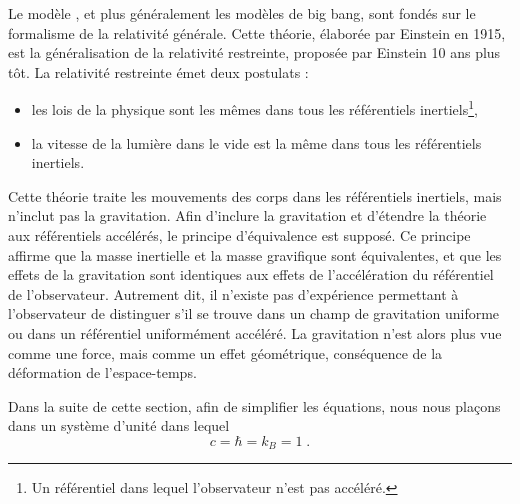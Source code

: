 Le modèle \lcdm{}, et plus généralement les modèles de big bang, sont fondés sur le formalisme de la relativité générale.
Cette théorie, élaborée par Einstein en 1915, est la généralisation de la relativité restreinte, proposée par Einstein 10 ans plus tôt. La relativité restreinte émet deux postulats :
  \begin{itemize}[label=$\bullet$]
  \item les lois de la physique sont les mêmes dans tous les référentiels inertiels\footnote{Un référentiel dans lequel l'observateur n'est pas accéléré.},
  \item la vitesse de la lumière dans le vide est la même dans tous les référentiels inertiels.
  \end{itemize}
Cette théorie traite les mouvements des corps dans les référentiels inertiels, mais n'inclut pas la gravitation. Afin d'inclure la gravitation et d'étendre la théorie aux référentiels accélérés, le principe d'équivalence est supposé.
Ce principe affirme que la masse inertielle et la masse gravifique sont équivalentes, et que les effets de la gravitation sont identiques aux effets de l'accélération du référentiel de l'observateur. Autrement dit, il n'existe pas d'expérience permettant à l'observateur de distinguer s'il se trouve dans un champ de gravitation uniforme ou dans un référentiel uniformément accéléré. La gravitation n'est alors plus vue comme une force, mais comme un effet géométrique, conséquence de la déformation de l'espace-temps.

Dans la suite de cette section, afin de simplifier les équations, nous nous plaçons dans un système d'unité dans lequel
  \begin{equation}
    c = \hbar = k_{B} = 1  \; .
  \end{equation}


